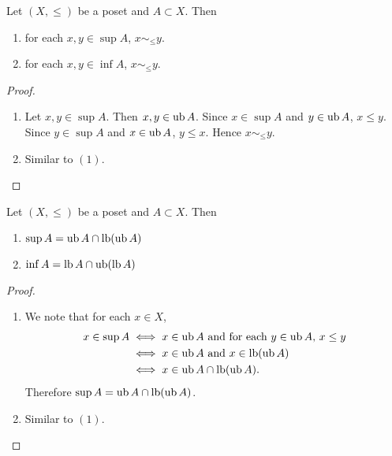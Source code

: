 \documentclass{book}
\begin{document}
	\begin{ex} 
		Let $(X, \leq)$ be a poset and $A \subset X$. Then
		\begin{enumerate}
			\item for each $x, y \in \sup A$, $x \sim_{\leq} y$.
			\item for each $x,y \in \inf A$, $x \sim_{\leq} y$.
		\end{enumerate}   
	\end{ex}
	
	\begin{proof}\
		\begin{enumerate}
			\item Let $x, y \in \sup A$. Then $x,y \in \operatorname{ub} A$. Since $x \in \sup A$ and $y \in \operatorname{ub} A$, $x \leq y$. Since $y \in \sup A$ and $x \in \operatorname{ub} A$, $y \leq x$. Hence $x \sim_{\leq} y$. 
			\item Similar to $(1)$.
		\end{enumerate}
	\end{proof}
	
	\begin{ex} 
		Let $(X, \leq)$ be a poset and $A \subset X$. Then 
		\begin{enumerate}
			\item $\sup A = \operatorname{ub} A \cap \operatorname{lb} (\operatorname{ub} A)$
			\item $\inf A = \operatorname{lb} A \cap \operatorname{ub}(\operatorname{lb} A)$
		\end{enumerate}
	\end{ex}
	
	\begin{proof}\
		\begin{enumerate}
			\item We note that for each $x \in X$,
			\begin{align*}
				x \in \sup A
				& \iff \text{$x \in \operatorname{ub} A$ and for each $y \in \operatorname{ub} A$, $x \leq y$} \\
				& \iff \text{$x \in \operatorname{ub} A$ and $x \in \operatorname{lb}(\operatorname{ub} A)$} \\
				& \iff x \in \operatorname{ub} A \cap \operatorname{lb} (\operatorname{ub} A). 
			\end{align*}
			Therefore $\sup A = \operatorname{ub} A \cap \operatorname{lb} (\operatorname{ub} A)$.
			\item Similar to $(1)$.
		\end{enumerate}
	\end{proof}
	
	
	
	
	
	
	
\end{document}
